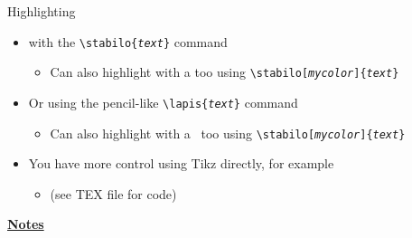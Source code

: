 \documentclass[10pt]{beamer}
\begin{document}
\begin{frame}
    {Highlighting}
    \begin{itemize}
        \item {} with the \texttt{\textbackslash stabilo\{\textit{text}\}} command  \medskip
        \begin{itemize}
            \item Can also highlight with a  too using \texttt{\textbackslash stabilo[\textit{mycolor}]\{\textit{text}\}}\bigskip\bigskip
        \end{itemize}
        \item Or  using the pencil-like \texttt{\textbackslash lapis\{\textit{text}\}} command \medskip
        \begin{itemize}
            \item Can also highlight with a  \ too using \texttt{\textbackslash stabilo[\textit{mycolor}]\{\textit{text}\}}\bigskip\bigskip
        \end{itemize}
        \item You have more control using Tikz directly, for example \medskip
        \begin{itemize}
            \item {} (see TEX file for code)
              \bigskip
        \end{itemize}
    \end{itemize}
\end{frame}
\begin{flushleft}
    \underline{\textbf{Notes}}\setlength{\parskip}{.15cm}\notesize\newline\par
\end{flushleft}
\end{document}

